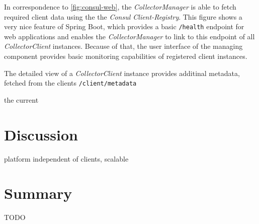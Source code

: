 In correspondence to \autoref{fig:consul-web}, the \textit{CollectorManager} is able to fetch required client data using the the \textit{Consul Client-Registry}.
This figure shows a very nice feature of Spring Boot, which provides a basic \verb|/health| endpoint for web applications and enables the
\textit{CollectorManager} to link to this endpoint of all \textit{CollectorClient} instances. Because of that, the user interface
of the managing component provides basic monitoring capabilities of registered client instances.

The detailed view of a \textit{CollectorClient} instance provides additinal metadata, fetched from the clients \verb|/client/metadata|

the current
%
%

\section{Discussion}

platform independent of clients, scalable
\section{Summary}

TODO

